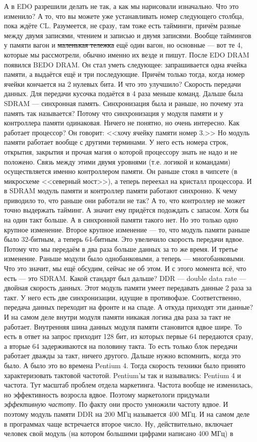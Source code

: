 \documentclass{article}
\begin{document}
    А в EDO разрешили делать не так, а как мы нарисовали изначально. Что это изменило? А то, что вы можете уже устанавливать номер следующего столбца, пока ждёте CL. Разумеется, не сразу, там тоже есть тайминги, причём разные между двумя записями, чтением и записью и двумя записями. Вообще таймингов у памяти вагон и \sout{маленькая тележка} ещё один вагон, но основные --- вот те 4, которые мы рассмотрели, обычно именно их везде и пишут. После EDO DRAM появился BEDO DRAM. Он стал уметь следующее: запрашивается одна ячейка памяти, а выдаётся ещё и три последующие. Причём только тогда, когда номер ячейки кончается на 2 нулевых бита. И что это улучшило? Скорость передачи данных. Для передачи кусочка подаётся в 4 раза меньше команд. Дальше была SDRAM --- синхронная память. Синхронизация была и раньше, но почему эта память так называется? Потому что синхронизация у модуля памяти и у контроллера памяти одинаковая. Ничего не понятно, но очень интересно. Как работает процессор? Он говорит: <<хочу ячейку памяти номер 3.>> Но модуль памяти работает вообще с другими терминами. У него есть номера строк, открытия, закрытия и прочая магия о которой процессору знать не надо и не положено. Связь между этими двумя уровнями (т.е. логикой и командами) осуществляется именно контроллером памяти. Он раньше стоял в чипсете (в микросхеме <<северный мост>>), а теперь переехал на кристалл процессора. И в SDRAM модуль памяти и контроллер памяти работают синхронно. К чему приводило то, что раньше они работали не так? А то, что контроллер не может точно выдержать тайминг. А значит ему придётся подождать с запасом. Хотя бы на один такт больше. А в синхронной памяти такого нет. Но это только одно крупное изменение. Второе крупное изменение --- то, что модуль памяти раньше было 32-битным, а теперь 64-битным. Это увеличило скорость передачи вдвое. Потому что мы передаём в два раза больше данных за то же время. И третье изменение. Раньше модули было однобанковыми, а теперь --- многобанковыми. Что это значит, мы ещё обсудим, сейчас не об этом. И с этого момента всё, что есть --- это SDRAM. Какой стандарт был дальше? DDR --- double data rate --- двойная скорость данных. Этот модуль памяти умеет передавать данные 2 раза за такт. У него есть две синхронизации, идущие в противофазе. Соответственно, передача данных переходит на фронте и на спаде. А откуда приходят эти данные? И на самом деле внутри модуля памяти никакая логика два раза за такт не работает. Внутренняя шина данных модуля памяти становится вдвое шире. То есть в ответ на запрос приходит 128 бит, из которых первые 64 передаются сразу, а вторые 64 задерживаются на половину такта. То есть только блок передачи работает дважды за такт, ничего другого. Дальше нужно вспомнить, когда это было. А было это во времена Pentium 4. Тогда скорость техники было принято характеризовать тактовой частотой. Pentium'ы так и назывались: Pentium 4 и частота. Тут масштаб проблем отдела маркетинга. Частота вообще не изменилась, но эффективность возросла вдвое. Поэтому маркетологи придумали \textit{эффективную частоту}. По факту они просто умножили частоту вдвое. И поэтому модуль памяти DDR на 200 МГц называется 400 МГц. И на самом деле в программах чаще встречается второе число. Ну, действительно, включает человек свой модуль (на котором большими цифрами написано 400 МГц) в 
\end{document}
